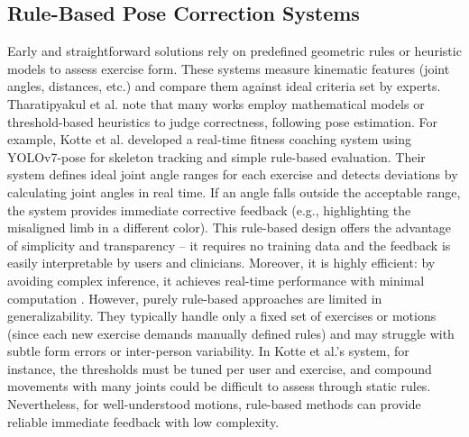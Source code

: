 \documentclass{article}
\begin{document}
\subsection{Rule-Based Pose Correction Systems} Early and straightforward solutions rely on predefined geometric rules or heuristic models to assess exercise form. These systems measure kinematic features (joint angles, distances, etc.) and compare them against ideal criteria set by experts. Tharatipyakul et al. \cite{Tharatipyakul2024Review} note that many works employ mathematical models or threshold-based heuristics to judge correctness, following pose estimation. For example, Kotte et al. \cite{Kotte2023} developed a real-time fitness coaching system using YOLOv7-pose for skeleton tracking and simple rule-based evaluation. Their system defines ideal joint angle ranges for each exercise and detects deviations by calculating joint angles in real time. If an angle falls outside the acceptable range, the system provides immediate corrective feedback (e.g., highlighting the misaligned limb in a different color). This rule-based design offers the advantage of simplicity and transparency – it requires no training data and the feedback is easily interpretable by users and clinicians. Moreover, it is highly efficient: by avoiding complex inference, it achieves real-time performance with minimal computation \cite{Kotte2023}. However, purely rule-based approaches are limited in generalizability. They typically handle only a fixed set of exercises or motions (since each new exercise demands manually defined rules) and may struggle with subtle form errors or inter-person variability. In Kotte et al.’s system, for instance, the thresholds must be tuned per user and exercise, and compound movements with many joints could be difficult to assess through static rules. Nevertheless, for well-understood motions, rule-based methods can provide reliable immediate feedback with low complexity. 
\end{document}
